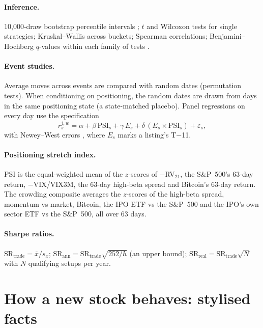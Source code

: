 \documentclass[11pt]{article}
\begin{document}
\paragraph{Inference.} 10,000-draw bootstrap percentile intervals \citep{efron1993}; $t$ and Wilcoxon tests for single strategies; Kruskal--Wallis across buckets; Spearman correlations; Benjamini--Hochberg $q$-values within each family of tests \citep{benjamini1995}.

\paragraph{Event studies.} Average moves across events are compared with random dates (permutation tests). When conditioning on positioning, the random dates are drawn from days in the same positioning state (a state-matched placebo). Panel regressions on every day use the specification
\begin{equation}
r^{j,w}_{s} = \alpha + \beta\,\text{PSI}_s + \gamma\,E_s + \delta\,(E_s \times \text{PSI}_s) + \varepsilon_s,
\end{equation}
with Newey--West errors \citep{newey1987}, where $E_s$ marks a listing's T$-$11.

\paragraph{Positioning stretch index.} PSI is the equal-weighted mean of the $z$-scores of $-$RV$_{21}$, the S\&P~500's 63-day return, $-$VIX/VIX3M, the 63-day high-beta spread and Bitcoin's 63-day return. The crowding composite averages the $z$-scores of the high-beta spread, momentum vs market, Bitcoin, the IPO ETF vs the S\&P~500 and the IPO's own sector ETF vs the S\&P~500, all over 63 days.

\paragraph{Sharpe ratios.} $\mathrm{SR}_{\text{trade}}=\bar x/s_x$; $\mathrm{SR}_{\text{ann}}=\mathrm{SR}_{\text{trade}}\sqrt{252/h}$ (an upper bound); $\mathrm{SR}_{\text{real}}=\mathrm{SR}_{\text{trade}}\sqrt{N}$ with $N$ qualifying setups per year.

\section{How a new stock behaves: stylised facts}
\end{document}
